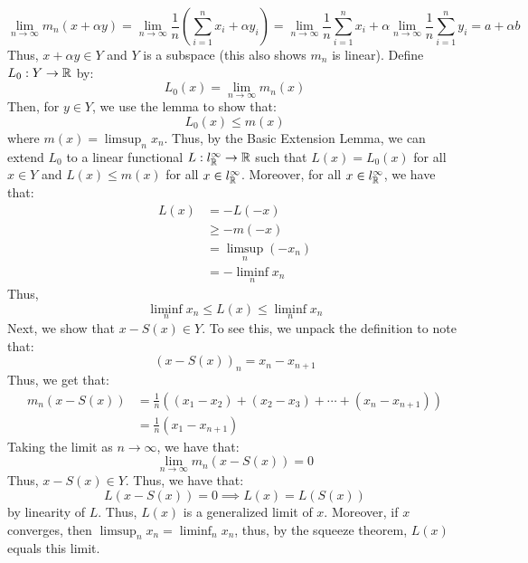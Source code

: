 \documentclass[12pt]{article}
\begin{document}
\begin{solution}
    \[ \lim_{n \to \infty} m_n(x + \alpha y) = \lim_{n\to \infty} \frac{1}{n}\left(\sum_{i =1}^n x_i + \alpha y_i\right) = \lim_{n\to \infty}  \frac{1}{n} \sum_{i=1}^n x_i + \alpha \lim_{n\to \infty}\frac{1}{n} \sum_{i=1}^n y_i = a + \alpha b \]
    Thus, $x+\alpha y \in Y$ and $Y$ is a subspace (this also shows $m_n$ is linear). \bbni
    Define $L_0: Y \to \mathbb R$ by: 
    \[ L_0(x) = \lim_{n \to \infty} m_n(x)\]
    Then, for $y \in Y$, we use the lemma to show that:
    \[ L_0(x) \leq m(x)\]
    where $m(x) = \limsup_n x_n$. \bbni
    Thus, by the Basic Extension Lemma, we can extend $L_0$ to a linear functional $L: l^\infty_\mathbb R \to \mathbb R$ such that $L(x) = L_0(x)$ for all $x \in Y$ and $L(x) \leq m(x)$ for all $x \in l^\infty_\mathbb R$. Moreover, for all $x \in l^\infty_\mathbb R$, we have that: 
    \begin{align*}
        L(x) &= -L(-x) \\
        &\geq -m(-x) \\
        &= \limsup_n (-x_n) \\
        &= -\liminf_n x_n
    \end{align*}
    Thus, 
    \[ \liminf_n x_n \leq L(x) \leq \liminf_n x_n\]
    Next, we show that $x-S(x) \in Y$. To see this, we unpack the definition to note that:
    \[ (x-S(x))_n = x_n - x_{n+1}\]
    Thus, we get that:
    \begin{align*}
        m_n(x-S(x)) &= \frac{1}{n}( (x_1-x_2) + (x_2-x_3) + \cdots + (x_{n}-x_{n+1})) \\
        &= \frac1n (x_1 - x_{n+1})
    \end{align*}
    Taking the limit as $n \to \infty$, we have that:
    \[ \lim_{n \to \infty} m_n(x-S(x)) = 0\]
    Thus, $x-S(x) \in Y$. \bbni
    Thus, we have that: 
    \[L(x-S(x)) = 0 \implies L(x) = L(S(x))\]
    by linearity of $L$. Thus, $L(x)$ is a generalized limit of $x$. Moreover, if $x$ converges, then $\limsup_n x_n = \liminf_n x_n$, thus, by the squeeze theorem, $L(x)$ equals this limit. 
\end{solution}
\newpage 
\end{document}
